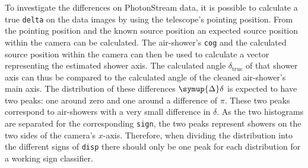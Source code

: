 To investigate the differences on PhotonStream data, it is possible to
calculate a true \texttt{delta} on the data images by using the telescope's pointing
position. From the pointing position and the known source position an
expected source position within the camera can be calculated. The
air-shower's \texttt{cog} and the calculated source position within the camera can
then be used to calculate a vector representing the estimated shower axis.
The calculated angle $\delta_\text{true}$ of that shower axis can thus be
compared to the calculated angle of the cleaned air-shower's main axis. The
distribution of these differences $\symup{\Delta}\delta$ is expected to have two peaks: one around
zero and one around a difference of $\pi$. These two peaks correspond to
air-showers with a very small difference in $\delta$. As the two histograms are
separated for the corresponding \texttt{sign}, the two peaks represent showers
on the two sides of the camera's $x$-axis. Therefore, when dividing the
distribution into the different signs of \texttt{disp} there should only be
one peak for each distribution for a working sign classifier.


